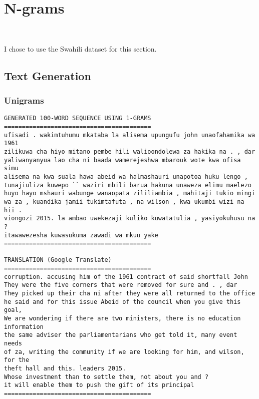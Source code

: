 \section{N-grams}~\label{sec:n-grams}

I chose to use the Swahili dataset for this section.

\subsection{Text Generation}

\subsubsection{Unigrams}

\begin{center}
\begin{verbatim}
GENERATED 100-WORD SEQUENCE USING 1-GRAMS
=========================================
ufisadi . wakimtuhumu mkataba la alisema upungufu john unaofahamika wa 1961 
zilikuwa cha hiyo mitano pembe hili walioondolewa za hakika na . , dar
yaliwanyanyua lao cha ni baada wamerejeshwa mbarouk wote kwa ofisa simu
alisema na kwa suala hawa abeid wa halmashauri unapotoa huku lengo ,
tunajiuliza kuwepo `` waziri mbili barua hakuna unaweza elimu maelezo
huyo hayo mshauri wabunge wanaopata zililiambia , mahitaji tukio mingi
wa za , kuandika jamii tukimtafuta , na wilson , kwa ukumbi wizi na hii .
viongozi 2015. la ambao uwekezaji kuliko kuwatatulia , yasiyokuhusu na ?
itawawezesha kuwasukuma zawadi wa mkuu yake
=========================================

TRANSLATION (Google Translate)
=========================================
corruption. accusing him of the 1961 contract of said shortfall John
They were the five corners that were removed for sure and . , dar
They picked up their cha ni after they were all returned to the office
he said and for this issue Abeid of the council when you give this goal,
We are wondering if there are two ministers, there is no education information
the same adviser the parliamentarians who get told it, many event needs
of za, writing the community if we are looking for him, and wilson, for the
theft hall and this. leaders 2015.
Whose investment than to settle them, not about you and ?
it will enable them to push the gift of its principal
=========================================
\end{verbatim}
\end{center}

